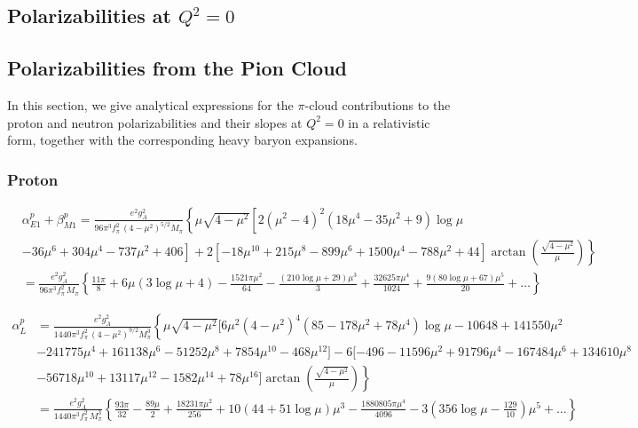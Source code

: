 \documentclass[twocolumn,prc,showpacs,nofootinbib,preprintnumbers,amsmath,amssymb,superscriptaddress]{revtex4-1}
\begin{document}
\begin{widetext}
\section{Polarizabilities at $Q^2=0$}\label{App:PolarizabilitiesAll}
\subsection{Polarizabilities from the Pion Cloud}
\label{App:Polarizabilities}

In this section, we give analytical expressions for the $\pi$-cloud contributions to the proton and neutron polarizabilities and their slopes at $Q^2=0$ in a relativistic form, together with the corresponding heavy baryon expansions.

\subsubsection{Proton}

\begin{align}
&\alpha_{E1}^p+\beta_{M1}^p = \frac{e^2 g_A^2}{96\pi^3 f_\pi^2\,  (4-\mu^2)^{5/2} M_\pi} \left\{ \mu \sqrt{4-\mu^2} \left[  2 (\mu^2-4)^2(18 \mu^4 -35\mu^2 + 9) \log\mu \right.\right. \nonumber \\
& \left.\left.-36 \mu^6 + 304 \mu^4 - 737 \mu^2+ 406 \right] + 2 \left[-18\mu^{10}+ 215 \mu^8 - 899 \mu^6 + 1500 \mu^4 - 788\mu^2 + 44\right] \arctan\left( \frac{\sqrt{4-\mu^2}}{\mu} \right)\right\} \nonumber \\
& = \frac{e^2 g_A^2}{96\pi^3 f_\pi^2\, M_\pi} \left\{  \frac{11 \pi }{8} + 6 \mu (3 \log \mu +4) - \frac{1521 \pi \mu^2}{64} -\frac{ (210 \log \mu + 29)\mu^3 }{3  } + \frac{ 32625 \pi \mu^4 }{1024 }  + \frac{ 9 (80 \log \mu + 67)\mu^5 }{20  }+\dots\right\}
\end{align}


\begin{align}
\alpha_{L}^p &= \frac{e^2 g_A^2}{1440 \pi^3 f_\pi^2\,  (4-\mu^2)^{9/2} M_\pi^3}\left\{   \mu  \sqrt{4-\mu^2} [ 6 \mu^2 (4-\mu^2)^4 (85 - 178 \mu^2 + 78 \mu^4) \log\mu -10648 + 141550 \mu^2 \nonumber \right.\\
&- 241775 \mu^4 + 161138 \mu^6 -51252 \mu^8 + 7854 \mu^{10} -468 \mu^{12}  ]  - 6 [-496 - 11596  \mu^2 + 91796 \mu^4 -167484 \mu^6 + 134610 \mu^8 \nonumber \\
&\left.-56718 \mu^{10} + 13117 \mu^{12} - 1582 \mu^{14} + 78 \mu^{16}] \arctan\left( \frac{\sqrt{4-\mu^2}}{\mu}\right) \right\}\nonumber\\
&= \frac{e^2 g_A^2}{1440 \pi^3 f_\pi^2\,  M_\pi^3}\left\{ \frac{93 \pi}{32} - \frac{89 \mu}{2} + \frac{18231 \pi \mu^2}{256} +10 (44+ 51 \log\mu )\mu^3 -\frac{1880805 \pi \mu^4}{4096} - 3\left(356 \log\mu -\frac{129}{10}\right)\mu^5 +\dots  \right\}
\end{align}



\end{widetext}
\end{document}
